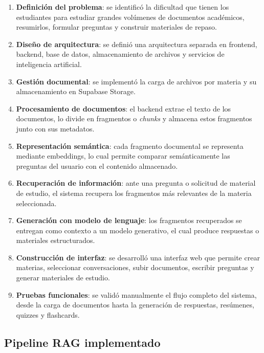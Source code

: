 \documentclass[12pt, letterpaper]{article}
\begin{document}
	\begin{enumerate}
		\item \textbf{Definición del problema}: se identificó la dificultad que tienen los estudiantes para estudiar grandes volúmenes de documentos académicos, resumirlos, formular preguntas y construir materiales de repaso.
		
		\item \textbf{Diseño de arquitectura}: se definió una arquitectura separada en frontend, backend, base de datos, almacenamiento de archivos y servicios de inteligencia artificial.
		
		\item \textbf{Gestión documental}: se implementó la carga de archivos por materia y su almacenamiento en Supabase Storage.
		
		\item \textbf{Procesamiento de documentos}: el backend extrae el texto de los documentos, lo divide en fragmentos o \textit{chunks} y almacena estos fragmentos junto con sus metadatos.
		
		\item \textbf{Representación semántica}: cada fragmento documental se representa mediante embeddings, lo cual permite comparar semánticamente las preguntas del usuario con el contenido almacenado.
		
		\item \textbf{Recuperación de información}: ante una pregunta o solicitud de material de estudio, el sistema recupera los fragmentos más relevantes de la materia seleccionada.
		
		\item \textbf{Generación con modelo de lenguaje}: los fragmentos recuperados se entregan como contexto a un modelo generativo, el cual produce respuestas o materiales estructurados.
		
		\item \textbf{Construcción de interfaz}: se desarrolló una interfaz web que permite crear materias, seleccionar conversaciones, subir documentos, escribir preguntas y generar materiales de estudio.
		
		\item \textbf{Pruebas funcionales}: se validó manualmente el flujo completo del sistema, desde la carga de documentos hasta la generación de respuestas, resúmenes, quizzes y flashcards.
	\end{enumerate}
	
	\subsection{Pipeline RAG implementado}
	
\end{document}
